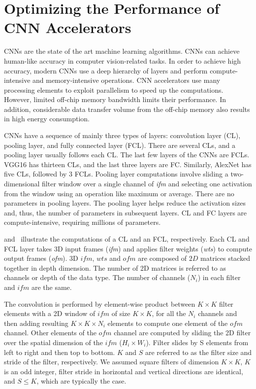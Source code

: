 \graphicspath{{./Ch3-CNN/images/}}

\chapter{Optimizing the Performance of CNN Accelerators} \label{chap:CNN}
CNNs are the state of the art machine learning algorithms. CNNs can achieve human-like accuracy in computer vision-related tasks. In order to achieve high accuracy, modern CNNs use a deep hierarchy of layers and perform compute-intensive and memory-intensive operations. CNN accelerators use many processing elements to exploit parallelism to speed up the computations. However, limited off-chip memory bandwidth limits their performance. In addition, considerable data transfer volume from the off-chip memory also results in high energy consumption.

CNNs have a sequence of mainly three types of layers: convolution layer (CL), pooling layer, and fully connected layer (FCL). There are several CLs, and a pooling layer usually follows each CL. The last few layers of the CNNs are FCLs. VGG16 has thirteen CLs, and the last three layers are FC. Similarly, AlexNet has five CLs, followed by 3 FCLs. Pooling layer computations involve sliding a two-dimensional filter window over a single channel of \textit{ifm} and selecting one activation from the window using an operation like maximum or average. There are no parameters in pooling layers. The pooling layer helps reduce the activation sizes and, thus, the number of parameters in subsequent layers. CL and FC layers are compute-intensive, requiring millions of parameters. 

 and~ illustrate the computations of a CL and an FCL, respectively. Each CL and FCL layer takes 3D input frames (\textit{ifm}) and applies filter weights (\textit{wts}) to compute output frames (\textit{ofm}). 3D $ifm$, $wts$ and $ofm$ are composed of $2D$ matrices stacked together in depth dimension. The number of 2D matrices is referred to as channels or depth of the data type. The number of channels ($N_i$) in each filter and $ifm$ are the same.

The convolution is performed by element-wise product between $K{\times}K$ filter elements with a 2D window of $ifm$ of size $K{\times}K$, for all the $N_i$ channels and then adding resulting $K{\times}K{\times}N_i$ elements to compute one element of the $ofm$ channel. Other elements of the $ofm$ channel are computed by sliding the 2D filter over the spatial dimension of the $ifm$ ($H_i{\times}W_i$). Filter slides by S elements from left to right and then top to bottom. $K$ and $S$ are referred to as the filter size and stride of the filter, respectively. We assumed square filters of dimension $K{\times}K$, $K$ is an odd integer, filter stride in horizontal and vertical directions are identical, and $S{\le}K$, which are typically the case. 

